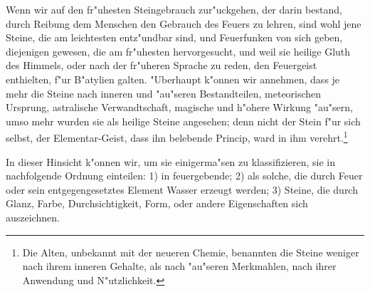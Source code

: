 \documentclass[a4paper, 11pt, oneside, polutonikogreek, german]{article}
\begin{document}
Wenn wir auf den fr"uhesten Steingebrauch zur"uckgehen, der darin bestand, durch Reibung dem Menschen den Gebrauch des Feuers zu lehren, sind wohl jene Steine, die am leichtesten entz"undbar sind, und Feuerfunken von sich geben, diejenigen gewesen, die am fr"uhesten hervorgesucht, und weil sie heilige Gluth des Himmels, oder nach der fr"uheren Sprache zu reden, den Feuergeist enthielten, f"ur B"atylien galten. "Uberhaupt k"onnen wir annehmen, dass je mehr die Steine nach inneren und "au"seren Bestandteilen, meteorischen Ursprung, astralische Verwandtschaft, magische und h"ohere Wirkung "au"sern, umso mehr wurden sie als heilige Steine angesehen; denn nicht der Stein f"ur sich selbst, der Elementar-Geist, dass ihn belebende Princip, ward in ihm verehrt.\footnote{Die Alten, unbekannt mit der neueren Chemie, benannten die Steine weniger nach ihrem inneren Gehalte, als nach "au"seren Merkmahlen, nach ihrer Anwendung und N"utzlichkeit.}

In dieser Hinsicht k"onnen wir, um sie einigerma"sen zu klassifizieren, sie in nachfolgende Ordnung einteilen: 1) in feuergebende; 2) als solche, die durch Feuer oder sein entgegengesetztes Element Wasser erzeugt werden; 3) Steine, die durch Glanz, Farbe, Durchsichtigkeit, Form, oder andere Eigenschaften sich auszeichnen.
\end{document}
